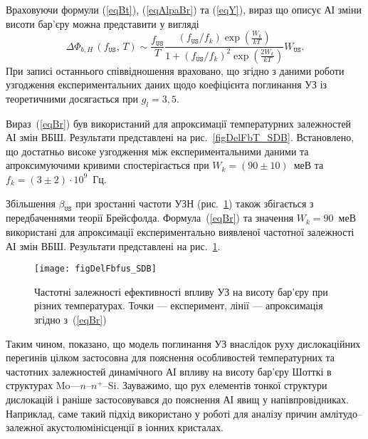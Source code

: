 Враховуючи формули (\ref{eqBt}), (\ref{eqAlpaBr}) та (\ref{eqY}),
вираз що описує АІ зміни висоти бар'єру можна представити у вигляді
\begin{equation}
\label{eqBr}
\Delta\Phi_{b,H}\,(f_\mathtt{US},\,T)\sim\frac{f_\mathtt{US}}{T}\frac{(f_\mathtt{US}/{f_k})\exp\left(\frac{W_k}{kT}\right)}
{1+(f_\mathtt{US}/{f_k})^2\exp\left(\frac{2W_k}{kT}\right)}W_\mathtt{US}.
\end{equation}
При записі останнього співвідношення враховано, що згідно з даними
 роботи \cite{Olikh:UPJ2014} узгодження експериментальних даних щодо коефіцієнта поглинання УЗ із теоретичними
досягається при $g_l=3,5$.



Вираз~(\ref{eqBr}) був використаний для апроксимації температурних залежностей АІ змін ВБШ.
Результати представлені на рис.~\ref{figDelFbT_SDB}.
Встановлено, що достатньо високе узгодження між експериментальними даними та апроксимуючими кривими спостерігається
при  $W_k=(90\pm10)$~меВ та $f_k=(3\pm2)\cdot10^9$~Гц.

Збільшення $\beta_\mathtt{US}$ при зростанні частоти УЗН (рис.~\ref{figDelFbfus_SDB}) також збігається
з передбаченнями теорії Брейсфолда.
Формула~(\ref{eqBr}) та значення $W_k=90$~меВ використані для апроксимації експериментально виявленої частотної залежності АІ змін ВБШ.
Результати представлені на рис.~\ref{figDelFbfus_SDB}.


\begin{figure}
\center
\texttt{[image: figDelFbfus\_SDB]}
\caption{\label{figDelFbfus_SDB}
Частотні залежності ефективності впливу УЗ на висоту бар'єру при різних температурах.
Точки --- експеримент,
лінії --- апроксимація згідно з~(\ref{eqBr})
}%
\end{figure}


Таким чином, показано, що модель поглинання УЗ внаслідок руху дислокаційних перегинів цілком застосовна
для пояснення особливостей температурних та частотних залежностей динамічного АІ впливу на висоту бар'єру Шотткі в структурах Mo---$n$--$n^+$--Si.
Зауважимо, що рух елементів тонкої структури дислокацій і раніше застосовувався до
пояснення АІ явищ у напівпровідниках.
Наприклад, саме такий підхід використано у роботі \cite{Loktev} для аналізу причин амлітудо--залежної акустолюмінісценції в іонних кристалах.



